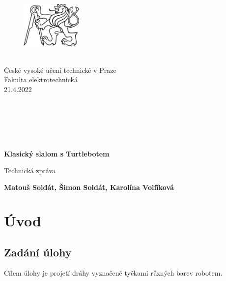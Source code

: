 \documentclass{article}
\begin{document}
\begin{titlepage}
            
	\begin{figure}
	\includegraphics[width=3cm]{ctu_logo_black-1.png}
	\end{figure}
	
	\large    
	\noindent
	\\   
       České vysoké učení technické v Praze\\
       Fakulta elektrotechnická\\
       21.4.2022
       \\ \\ \\ \\ \\ \\

	\begin{center}
	\huge
       \textbf{Klasický slalom s Turtlebotem}

       \vspace{0.5cm}
       \Large
        Technická zpráva
            
       \vspace{1.2cm}

       {\bf Matouš Soldát, Šimon Soldát, Karolína Volfíková}

       \vfill
       
	\end{center}            

\end{titlepage}

\newpage

\tableofcontents

\newpage

\section{Úvod}
\subsection{Zadání úlohy}

	Cílem úlohy  je projetí dráhy vyznačené tyčkami různých barev robotem. 
	
\end{document}
